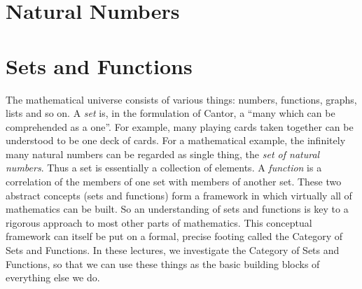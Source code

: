 \documentclass[print]{lecnotes}
\begin{document}
	
	\frontmatter
	\notestitle
	\clearpage
	
	\thispagestyle{empty}
	\tableofcontents


%


	\mainmatter
	\part{Natural Numbers}
	
	
	
	\part{Sets and Functions}
	The mathematical universe consists of various things: numbers, functions, graphs, lists and so on.
	A \emph{set} is, in the formulation of Cantor, a ``many which can be comprehended as a one''. For example, many playing cards taken together can be understood 
	to be one deck of cards.
	For a mathematical example, the infinitely many natural numbers can be regarded as single thing, the \emph{set of natural numbers}. Thus a set is essentially a collection of elements. 
	A \emph{function} is a correlation of the members of one set with members of another set.
	These two abstract concepts (sets and functions) form a framework in which virtually all of mathematics can be built.
	So an understanding of sets and functions is key to a rigorous approach to most other parts of mathematics.
	This conceptual framework can itself be put on a formal, precise footing called the Category of Sets and Functions.
	In these lectures, we investigate the Category of Sets and Functions, so that we can use these things as the basic building blocks of everything else we do.
	
	
	
	
	
\end{document}
